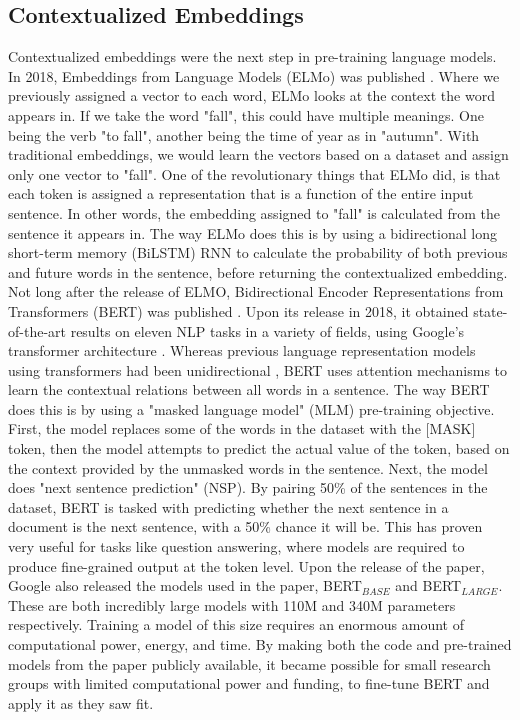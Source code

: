 \documentclass{report}
\begin{document}
\subsection{Contextualized Embeddings}
Contextualized embeddings were the next step in pre-training language models. In 2018, Embeddings from Language Models (ELMo) was published \cite{Peters:2018}. Where we previously assigned a vector to each word, ELMo looks at the context the word appears in. If we take the word "fall", this could have multiple meanings. One being the verb "to fall", another being the time of year as in "autumn". With traditional embeddings, we would learn the vectors based on a dataset and assign only one vector to "fall". One of the revolutionary things that ELMo did, is that each token is assigned a representation that is a function of the entire input sentence. In other words, the embedding assigned to "fall" is calculated from the sentence it appears in. The way ELMo does this is by using a bidirectional long short-term memory (BiLSTM) RNN to calculate the probability of both previous and future words in the sentence, before returning the contextualized embedding.\\
Not long after the release of ELMO, Bidirectional Encoder Representations from Transformers (BERT) was published \cite{DBLP:journals/corr/abs-1810-04805}. Upon its release in 2018, it obtained state-of-the-art results on eleven NLP tasks in a variety of fields, using Google's transformer architecture \cite{DBLP:journals/corr/VaswaniSPUJGKP17}. Whereas previous language representation models using transformers had been unidirectional \cite{radford2018improving}, BERT uses attention mechanisms to learn the contextual relations between all words in a sentence. The way BERT does this is by using a "masked language model" (MLM) pre-training objective. First, the model replaces some of the words in the dataset with the [MASK] token, then the model attempts to predict the actual value of the token, based on the context provided by the unmasked words in the sentence. Next, the model does "next sentence prediction" (NSP). By pairing 50\% of the sentences in the dataset, BERT is tasked with predicting whether the next sentence in a document is the next sentence, with a 50\% chance it will be. This has proven very useful for tasks like question answering, where models are required to produce fine-grained output at the token level. Upon the release of the paper, Google also released the models used in the paper, BERT$_{BASE}$ and BERT$_{LARGE}$. These are both incredibly large models with 110M and 340M parameters respectively. Training a model of this size requires an enormous amount of computational power, energy, and time. By making both the code and pre-trained models from the paper publicly available, it became possible for small research groups with limited computational power and funding, to fine-tune BERT and apply it as they saw fit.
\end{document}

